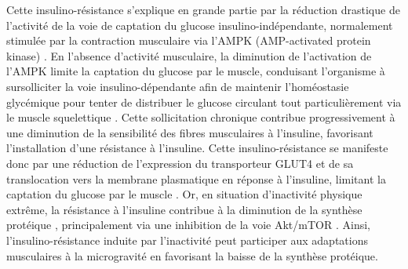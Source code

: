 \documentclass[11pt]{report}
\begin{document}
Cette insulino-résistance s'explique en grande partie par la réduction drastique de l'activité de la voie de captation du glucose insulino-indépendante, normalement stimulée par la contraction musculaire via l'AMPK (AMP-activated protein kinase) \parencite{Richter2013Jul}. En l'absence d'activité musculaire, la diminution de l'activation de l'AMPK limite la captation du glucose par le muscle, conduisant l'organisme à sursolliciter la voie insulino-dépendante afin de maintenir l'homéostasie glycémique pour tenter de distribuer le glucose circulant tout particulièrement via le muscle squelettique \parencite{Yaribeygi2021Oct}. Cette sollicitation chronique contribue progressivement à une diminution de la sensibilité des fibres musculaires à l'insuline, favorisant l'installation d'une résistance à l'insuline. Cette insulino-résistance se manifeste donc par une réduction de l'expression du transporteur GLUT4 et de sa translocation vers la membrane plasmatique en réponse à l'insuline, limitant la captation du glucose par le muscle \parencite{Eggelbusch2024Jan}. Or, en situation d'inactivité physique extrême, la résistance à l'insuline contribue à la diminution de la synthèse protéique \parencite{Gao2018Mar}, principalement via une inhibition de la voie Akt/mTOR \parencite{Gordon2013Oct}. Ainsi, l'insulino-résistance induite par l'inactivité peut participer aux adaptations musculaires à la microgravité en favorisant la baisse de la synthèse protéique.
\end{document}
